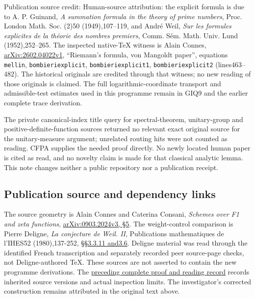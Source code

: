 Publication source credit: Human-source attribution: the explicit
formula is due to A. P. Guinand, \emph{A summation formula in the theory
of prime numbers}, Proc. London Math. Soc. (2)50 (1949),107--119, and
André Weil, \emph{Sur les formules explicites de la théorie des nombres
premiers}, Comm. Sém. Math. Univ. Lund (1952),252--265. The inspected
native-TeX witness is Alain Connes,
\href{https://arxiv.org/abs/2602.04022v1}{arXiv:2602.04022v1},
``Riemann's formula, von Mangoldt paper'', equations \texttt{mellin},
\texttt{bombieriexplicit}, \texttt{bombieriexplicit1},
\texttt{bombieriexplicit2} (lines463--482). The historical originals are
credited through that witness; no new reading of those originals is
claimed. The full logarithmic-coordinate transport and admissible-test
estimates used in this programme remain in GIQ9 and the earlier complete
trace derivation.

The private canonical-index title query for spectral-theorem,
unitary-group and positive-definite-function sources returned no
relevant exact original source for the unitary-measure argument;
unrelated routing hits were not counted as reading. CFPA supplies the
needed proof directly. No newly located human paper is cited as read,
and no novelty claim is made for that classical analytic lemma. This
note changes neither a public repository nor a publication receipt.

\subsection{Publication source and dependency
links}\label{publication-source-and-dependency-links}

The source geometry is Alain Connes and Caterina Consani, \emph{Schemes
over F1 and zeta functions},
\href{https://arxiv.org/abs/0903.2024v3}{arXiv:0903.2024v3, §5}. The
weight-control comparison is Pierre Deligne, \emph{La conjecture de
Weil. II}, Publications mathematiques de l'IHES52 (1980),137-252,
\href{https://www.numdam.org/item/PMIHES_1980__52__137_0/}{§§3.3.11
and3.6}. Deligne material was read through the identified French
transcription and separately recorded peer source-page checks, not
Deligne-authored TeX. These sources are not asserted to contain the new
programme derivations. The
\href{https://github.com/KokunoYumeto/zeta-function-research-reader/blob/36a82ecca98addb8a98b48204e349737856c7223/workbenches/splitzero-tandem/continuations/20260924-cohomology-weight-and-character-lifts/BUILD_AND_REVIEW.md}{preceding
complete proof and reading record} records inherited source versions and
actual inspection limits. The investigator's corrected construction
remains attributed in the original text above.
